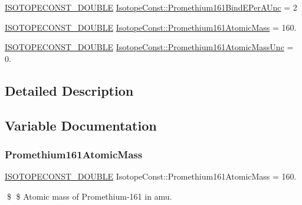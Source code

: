 \begin{DoxyCompactItemize}
\mbox{\hyperlink{group___isotope_const-_macros_ga8f45a7272ce02c0b4c65c44636ed719a}{I\+S\+O\+T\+O\+P\+E\+C\+O\+N\+S\+T\+\_\+\+D\+O\+U\+B\+LE}} \mbox{\hyperlink{group___isotope_const-_promethium-_pm161_ga310764cb882e42c885a5de894cc41f96}{Isotope\+Const\+::\+Promethium161\+Bind\+E\+Per\+A\+Unc}} = 2
\item 
\mbox{\hyperlink{group___isotope_const-_macros_ga8f45a7272ce02c0b4c65c44636ed719a}{I\+S\+O\+T\+O\+P\+E\+C\+O\+N\+S\+T\+\_\+\+D\+O\+U\+B\+LE}} \mbox{\hyperlink{group___isotope_const-_promethium-_pm161_ga5c0691b84e41e2250b9c26b5fea8959d}{Isotope\+Const\+::\+Promethium161\+Atomic\+Mass}} = 160.
\item 
\mbox{\hyperlink{group___isotope_const-_macros_ga8f45a7272ce02c0b4c65c44636ed719a}{I\+S\+O\+T\+O\+P\+E\+C\+O\+N\+S\+T\+\_\+\+D\+O\+U\+B\+LE}} \mbox{\hyperlink{group___isotope_const-_promethium-_pm161_gaf6df5165c42a5b533938d97bb21fc77f}{Isotope\+Const\+::\+Promethium161\+Atomic\+Mass\+Unc}} = 0.
\end{DoxyCompactItemize}


\subsection{Detailed Description}


\subsection{Variable Documentation}
\mbox{\label{group___isotope_const-_promethium-_pm161_ga5c0691b84e41e2250b9c26b5fea8959d}} 
\subsubsection{\texorpdfstring{Promethium161\+Atomic\+Mass}{Promethium161AtomicMass}}
{\footnotesize\ttfamily \mbox{\hyperlink{group___isotope_const-_macros_ga8f45a7272ce02c0b4c65c44636ed719a}{I\+S\+O\+T\+O\+P\+E\+C\+O\+N\+S\+T\+\_\+\+D\+O\+U\+B\+LE}} Isotope\+Const\+::\+Promethium161\+Atomic\+Mass = 160.}

\$ \$ Atomic mass of Promethium-\/161 in amu. \mbox{\label{group___isotope_const-_promethium-_pm161_gaf6df5165c42a5b533938d97bb21fc77f}} 
